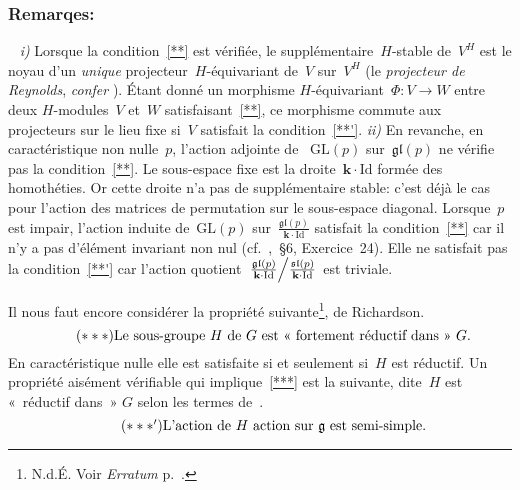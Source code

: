 \documentclass[french]{amsart}
\newcommand{\kk}{\mathbf{k}}
\newcommand{\GL}{\mathrm{GL}}
\newcommand{\lie}[1]{{\mathfrak{#1}}}
\newcommand{\gl}{\lie{gl}}
\newcommand{\Id}{\mathrm{Id}}
\begin{document}
\subsubsection*{Remarqes:}{~}
\newline\noindent
\textit{i)}\label{Remarquei}
 Lorsque la condition~\eqref{**} est vérifiée, le supplémentaire~$H$-stable de~$V^H$ est le noyau d'un \emph{unique} projecteur~$H$-équivariant de~$V$ sur~$V^H$ (le \emph{projecteur de
Reynolds}, \emph{confer} \cite{Dem76}). Étant donné un morphisme $H$-équivariant~$\Phi : V \rightarrow W$ entre deux $H$-mo\-du\-les~$V$ et~$W$ satisfaisant~\eqref{**}, ce morphisme commute aux projecteurs sur le lieu fixe si~$V$ satisfait la condition~\eqref{**'}.
\newline
\textit{ii)}\label{Remarqueii}
En revanche, en caractéristique non nulle~$p$, l'action adjointe de ~$\GL(p)$ sur~$\gl(p)$ ne vérifie pas la condition~\eqref{**}. Le sous-espace fixe est la droite~$\kk\cdot\Id$ formée des homothéties. Or cette droite n'a pas de supplémentaire stable: c'est déjà le cas 
pour l'action des matrices de permutation sur le sous-espace diagonal. Lorsque~$p$ est impair, l'action induite de~$\GL(p)$ sur~$\frac{\lie{gl}(p)}{\kk\cdot\Id}$ satisfait la condition~\eqref{**} car il n'y a pas d'élément invariant non nul (cf.~\cite{Bou60},~\S6, Exercice~24). Elle ne satisfait pas la condition~\eqref{**'} car l'action quotient~$\left.\frac{\lie{gl}(p)}{\kk\cdot\Id}\middle/\frac{\lie{sl}(p)}{\kk\cdot\Id}\right.$ est triviale.

Il nous faut encore considérer la propriété suivante\footnote{N.d.É. Voir \emph{Erratum} p.~\pageref{Erratum}.}, de Richardson.
\begin{equation}\tag{\text{$\ast\ast\ast$}}\label{***}
\text{Le sous-groupe~$H$ de~$G$ est «~fortement réductif dans~»~$G$.}
\end{equation}
En caractéristique nulle elle est  satisfaite si et seulement si~$H$ est réductif. Un propriété aisément vérifiable qui implique~\eqref{***} est la suivante, dite~$H$ est «~réductif dans~» $G$ selon les termes de~\cite{RichardShah}.
\begin{equation}\tag{\text{$\ast\ast\ast^\prime$}}\label{***'}
\text{L'action de~$H$ action sur~$\lie{g}$ est semi-simple.}
\end{equation}
\end{document}
